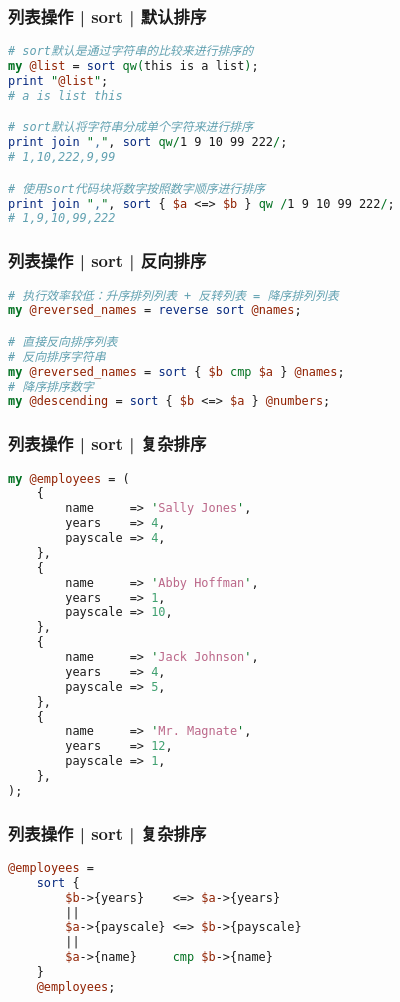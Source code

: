 \begin{frame}[fragile]
  \frametitle{列表操作 | sort | \alert{默认排序}}
\begin{lstlisting}[language=Perl]
# sort默认是通过字符串的比较来进行排序的
my @list = sort qw(this is a list);
print "@list";
# a is list this

# sort默认将字符串分成单个字符来进行排序
print join ",", sort qw/1 9 10 99 222/;
# 1,10,222,9,99

# 使用sort代码块将数字按照数字顺序进行排序
print join ",", sort { $a <=> $b } qw /1 9 10 99 222/;
# 1,9,10,99,222
\end{lstlisting}
\end{frame}

\begin{frame}[fragile]
  \frametitle{列表操作 | sort | \alert{反向排序}}
\begin{lstlisting}[language=Perl]
# 执行效率较低：升序排列列表 + 反转列表 = 降序排列列表
my @reversed_names = reverse sort @names;

# 直接反向排序列表
# 反向排序字符串
my @reversed_names = sort { $b cmp $a } @names;
# 降序排序数字
my @descending = sort { $b <=> $a } @numbers;
\end{lstlisting}
\end{frame}

\begin{frame}[fragile]
  \frametitle{列表操作 | sort | 复杂排序}
  \vspace{-1.8em}
\begin{lstlisting}[language=Perl,basicstyle=\scriptsize\tt]
my @employees = (
    {
        name     => 'Sally Jones',
        years    => 4,
        payscale => 4,
    },
    {
        name     => 'Abby Hoffman',
        years    => 1,
        payscale => 10,
    },
    {
        name     => 'Jack Johnson',
        years    => 4,
        payscale => 5,
    },
    {
        name     => 'Mr. Magnate',
        years    => 12,
        payscale => 1,
    },
);
\end{lstlisting}
\end{frame}

\begin{frame}[fragile]
  \frametitle{列表操作 | sort | 复杂排序}
\begin{lstlisting}[language=Perl]
@employees = 
    sort {
        $b->{years}    <=> $a->{years}
        ||
        $a->{payscale} <=> $b->{payscale}
        ||
        $a->{name}     cmp $b->{name}
    }
    @employees;
\end{lstlisting}
\end{frame}

